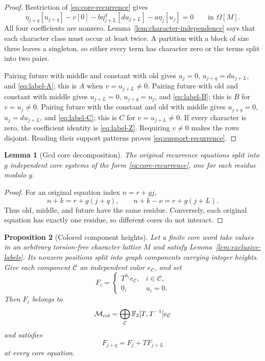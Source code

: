 \documentclass[11pt]{article}
\newcommand{\F}{\mathbb{F}}
\newcommand{\Om}{\Omega}
\newtheorem{lemma}{Lemma}[section]
\newtheorem{proposition}[lemma]{Proposition}
\theoremstyle{remark}
\numberwithin{equation}{section}
\begin{document}
\begin{proof}
Restriction of \eqref{eq:core-recurrence} gives
\begin{equation}\label{eq:four-term-identity}
 \eta_{j+q}[u_{j+q}]-c[0]
 -b\eta_{j+L}^{d}[du_{j+L}]-a\eta_j[u_j]=0
 \qquad\text{in }\Om[M].
\end{equation}
All four coefficients are nonzero.  Lemma~\ref{lem:character-independence} says that each character class must occur at least twice.  A partition with a block of size three leaves a singleton, so either every term has character zero or the terms split into two pairs.

Pairing future with middle and constant with old gives
\(u_j=0\), \(u_{j+q}=du_{j+L}\), and \eqref{eq:label-A}; this is \(A\) when \(v=u_{j+L}\neq0\).  Pairing future with old and constant with middle gives
\(u_{j+L}=0\), \(u_{j+q}=u_j\), and \eqref{eq:label-B}; this is \(B\) for \(v=u_j\neq0\).  Pairing future with the constant and old with middle gives
\(u_{j+q}=0\), \(u_j=du_{j+L}\), and \eqref{eq:label-C}; this is \(C\) for \(v=u_{j+L}\neq0\).  If every character is zero, the coefficient identity is \eqref{eq:label-Z}.  Requiring \(v\neq0\) makes the rows disjoint.  Reading their support patterns proves \eqref{eq:support-recurrence}.
\end{proof}

\begin{lemma}[Gcd core decomposition]\label{lem:gcd-cores}
The original recurrence equations split into \(g\) independent core systems of the form \eqref{eq:core-recurrence}, one for each residue modulo \(g\).
\end{lemma}

\begin{proof}
For an original equation index \(n=r+gj\),
\[
 n+k=r+g(j+q),\qquad n+k-\nu=r+g(j+L).
\]
Thus old, middle, and future have the same residue.  Conversely, each original equation has exactly one residue, so different cores do not interact.
\end{proof}

\begin{proposition}[Colored component heights]\label{prop:colored-heights}
Let a finite core word take values in an arbitrary torsion-free character lattice \(M\) and satisfy Lemma~\ref{lem:exclusive-labels}.  Its nonzero positions split into graph components carrying integer heights.  Give each component \(\mathcal C\) an independent color \(e_{\mathcal C}\), and set
\[
 F_i=\begin{cases}
 T^{h_i}e_{\mathcal C},&i\in\mathcal C,\\
 0,&u_i=0.
 \end{cases}
\]
Then \(F_i\) belongs to
\[
 \mathcal M_{\rm col}
 =\bigoplus_{\mathcal C}\F_2[T,T^{-1}]e_{\mathcal C}
\]
and satisfies
\begin{equation}\label{eq:colored-recurrence}
 F_{j+q}=F_j+T F_{j+L}
\end{equation}
at every core equation.
\end{proposition}
\end{document}
